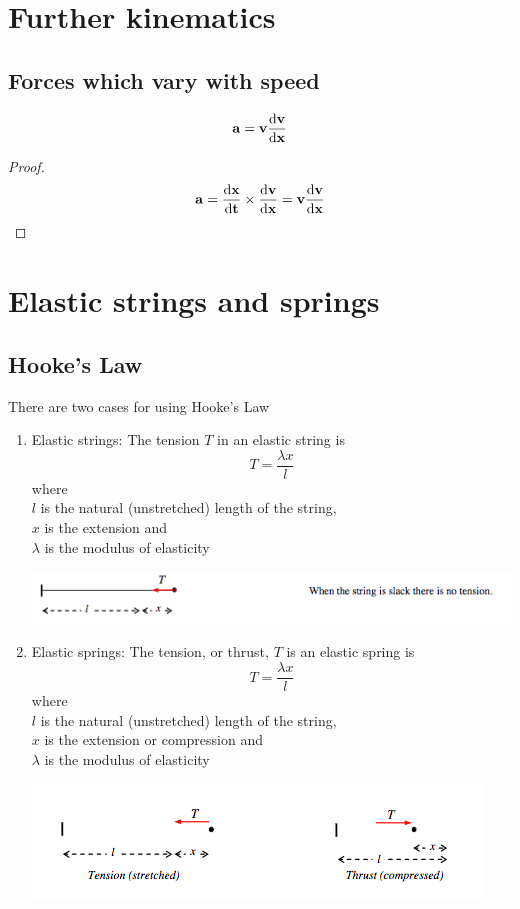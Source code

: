 \documentclass[a4paper]{article}
\begin{document}
\section{Further kinematics}
\subsection{Forces which vary with speed}
\begin{prop}
	\[
		\mathbf{a}=\mathbf{v}\frac{\mathrm{d} \mathbf{v}}{\mathrm{d} \mathbf{x}}
	\]
	\begin{proof}
		\[
			\mathbf{a}=\frac{\mathrm{d} \mathbf{x}}{\mathrm{d} \mathbf{t}}\times \frac{\mathrm{d} \mathbf{v}}{\mathrm{d} \mathbf{x}}=\mathbf{v}\frac{\mathrm{d} \mathbf{v}}{\mathrm{d} \mathbf{x}}
		\]
	\end{proof}
\end{prop}
\section{Elastic strings and springs}
\subsection{Hooke's Law}
\begin{law}
	There are two cases for using Hooke's Law
	\begin{enumerate}
		\item Elastic strings: The tension $T$ in an elastic string is
		      \[
			      T=\frac{\lambda x}{l}
		      \]
		      where \\
		      $l$ is the natural (unstretched) length of the string,\\
		      $x$ is the extension and\\
		      $\lambda$ is the modulus of elasticity
		      \begin{center}
			      \includegraphics[scale=0.5]{img_M/12_intro1}
		      \end{center}
		\item Elastic springs: The tension, or thrust, $T$ is an elastic spring is
		      \[
			      T=\frac{\lambda x}{l}
		      \]
		      where \\
		      $l$ is the natural (unstretched) length of the string,\\
		      $x$ is the extension or compression and\\
		      $\lambda$ is the modulus of elasticity
		      \begin{center}
			      \includegraphics[scale=0.5]{img_M/12_intro2}
		      \end{center}
	\end{enumerate}
\end{law}
\end{document}
